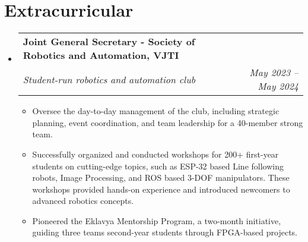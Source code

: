 \documentclass[letterpaper,11pt]{article}
\makeatletter
\newcommand{\resumeItem}[1]{
  \item\small{
    {#1 \vspace{-2pt}}
  }
}
\newcommand{\resumeSubheading}[4]{
  \vspace{-2pt}\item
    \begin{tabular*}{1.0\textwidth}[t]{l@{\extracolsep{\fill}}r}
      \textbf{#1} & \textbf{\small #2} \\
      \textit{\small#3} & \textit{\small #4} \\
    \end{tabular*}\vspace{-7pt}
}
\newcommand{\resumeSubHeadingListStart}{\begin{itemize}[leftmargin=0.0in, label={}]}
\newcommand{\resumeSubHeadingListEnd}{\end{itemize}}
\newcommand{\resumeItemListStart}{\begin{itemize}}
\newcommand{\resumeItemListEnd}{\end{itemize}\vspace{-5pt}}
\makeatother
\begin{document}
\section{Extracurricular}
\resumeSubHeadingListStart
\resumeSubheading
{Joint General Secretary - Society of Robotics and Automation, VJTI}{}{Student-run robotics and automation club \href{https://sravjti.in}{\faExternalLink}}{May 2023 -- May 2024}
\resumeItemListStart
\resumeItem{Oversee the day-to-day management of the club, including strategic planning, event coordination, and team leadership for a 40-member strong team.}
\resumeItem{Successfully organized and conducted workshops for 200+ first-year students on cutting-edge topics, such as ESP-32 based Line following robots, Image Processing, and ROS based 3-DOF manipulators. These workshops provided hands-on experience and introduced newcomers to advanced robotics concepts.}
\resumeItem{Pioneered the Eklavya Mentorship Program, a two-month initiative, guiding three teams second-year students through FPGA-based projects.}
\resumeItemListEnd
\resumeSubHeadingListEnd
\end{document}
